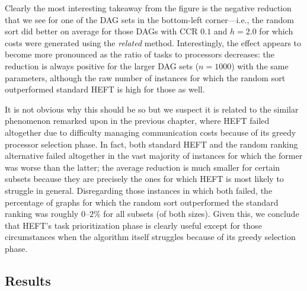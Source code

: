 \documentclass[12pt]{article}
\begin{document}
Clearly the most interesting takeaway from the figure is the negative reduction that we see for one of the DAG sets in the bottom-left corner---i.e., the random sort did better on average for those DAGs with CCR $0.1$ and $h = 2.0$ for which costs were generated using the {\em related} method. Interestingly, the effect appears to become more pronounced as the ratio of tasks to processors decreases: the reduction is always positive for the larger DAG sets ($n = 1000$) with the same parameters, although the raw number of instances for which the random sort outperformed standard HEFT is high for those as well. 

It is not obvious why this should be so but we suspect it is related to the similar phenomenon remarked upon in the previous chapter, where HEFT failed altogether due to difficulty managing communication costs because of its greedy processor selection phase. In fact, both standard HEFT and the random ranking alternative failed altogether in the vast majority of instances for which the former was worse than the latter; the average reduction is much smaller for certain subsets because they are precisely the ones for which HEFT is most likely to struggle in general. Disregarding those instances in which both failed, the percentage of graphs for which the random sort outperformed the standard ranking was roughly $0$--$2\%$ for all subsets (of both sizes). Given this, we conclude that HEFT's task prioritization phase is clearly useful except for those circumstances when the algorithm itself struggles because of its greedy selection phase. 


\subsection{Results}
\label{subsect.evaluation}
\end{document}
